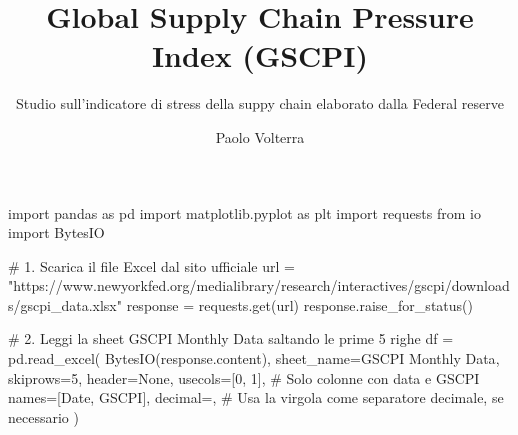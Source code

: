 \documentclass[
  11pt,
  letterpaper,
  DIV=11,
  numbers=noendperiod]{scrartcl}
\title{Global Supply Chain Pressure Index (GSCPI)}
\subtitle{Studio sull'indicatore di stress della suppy chain elaborato
dalla Federal reserve}
\author{Paolo Volterra}
\date{}
\newenvironment{Shaded}{\begin{snugshade}}{\end{snugshade}}
\newcommand{\CommentTok}[1]{\textcolor[rgb]{0.37,0.37,0.37}{#1}}
\newcommand{\DecValTok}[1]{\textcolor[rgb]{0.68,0.00,0.00}{#1}}
\newcommand{\ImportTok}[1]{\textcolor[rgb]{0.00,0.46,0.62}{#1}}
\newcommand{\NormalTok}[1]{\textcolor[rgb]{0.00,0.23,0.31}{#1}}
\newcommand{\OperatorTok}[1]{\textcolor[rgb]{0.37,0.37,0.37}{#1}}
\newcommand{\StringTok}[1]{\textcolor[rgb]{0.13,0.47,0.30}{#1}}
\newcommand{\VariableTok}[1]{\textcolor[rgb]{0.07,0.07,0.07}{#1}}
\renewcommand*\contentsname{Table of contents}
\newcommand\contentsname{Table of contents}
\begin{document}
\maketitle

\renewcommand*\contentsname{Table of contents}
{
\hypersetup{linkcolor=}
\setcounter{tocdepth}{3}
\tableofcontents
}

\begin{Shaded}
\begin{Highlighting}[]
\ImportTok{import}\NormalTok{ pandas }\ImportTok{as}\NormalTok{ pd}
\ImportTok{import}\NormalTok{ matplotlib.pyplot }\ImportTok{as}\NormalTok{ plt}
\ImportTok{import}\NormalTok{ requests}
\ImportTok{from}\NormalTok{ io }\ImportTok{import}\NormalTok{ BytesIO}

\CommentTok{\# 1. Scarica il file Excel dal sito ufficiale}
\NormalTok{url }\OperatorTok{=} \StringTok{"https://www.newyorkfed.org/medialibrary/research/interactives/gscpi/downloads/gscpi\_data.xlsx"}
\NormalTok{response }\OperatorTok{=}\NormalTok{ requests.get(url)}
\NormalTok{response.raise\_for\_status()}

\CommentTok{\# 2. Leggi la sheet \textquotesingle{}GSCPI Monthly Data\textquotesingle{} saltando le prime 5 righe}
\NormalTok{df }\OperatorTok{=}\NormalTok{ pd.read\_excel(}
\NormalTok{    BytesIO(response.content),}
\NormalTok{    sheet\_name}\OperatorTok{=}\StringTok{\textquotesingle{}GSCPI Monthly Data\textquotesingle{}}\NormalTok{,}
\NormalTok{    skiprows}\OperatorTok{=}\DecValTok{5}\NormalTok{,}
\NormalTok{    header}\OperatorTok{=}\VariableTok{None}\NormalTok{,}
\NormalTok{    usecols}\OperatorTok{=}\NormalTok{[}\DecValTok{0}\NormalTok{, }\DecValTok{1}\NormalTok{],  }\CommentTok{\# Solo colonne con data e GSCPI}
\NormalTok{    names}\OperatorTok{=}\NormalTok{[}\StringTok{\textquotesingle{}Date\textquotesingle{}}\NormalTok{, }\StringTok{\textquotesingle{}GSCPI\textquotesingle{}}\NormalTok{],}
\NormalTok{    decimal}\OperatorTok{=}\StringTok{\textquotesingle{},\textquotesingle{}}      \CommentTok{\# Usa la virgola come separatore decimale, se necessario}
\NormalTok{)}
\end{Highlighting}
\end{Shaded}
\end{document}
